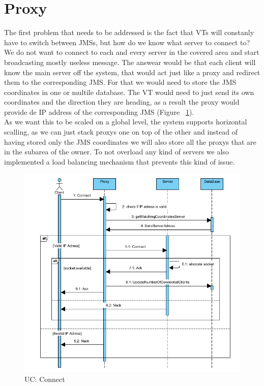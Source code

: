 \documentclass[17pt]{report}
\begin{document}
\section{Proxy}
\indent \indent
The first problem that needs to be addressed is the fact that VTs will 
constanly have to switch between JMSs, but how do we know what server to 
connect to? We do not want to connect to each and every server in the 
covered area and start broadcasting mostly useless message. The answear
would be that each client will know the main server off the system, that
would act just like a proxy and redirect them to the corresponding JMS.
For that we would need to store the JMS coordinates in one or multile
database. The VT would need to just send its own coordinates and the
direction they are heading, as a result the proxy would provide de IP
address of the corresponding JMS (Figure ~\ref{fig:UC_Connect}).\\
\indent \indent
As we want this to be scaled on a global level, the system supports
horizontal scalling, as we can just stack proxys one on top of the 
other and instead of having stored only the JMS coordinates we 
will also store all the proxys that are in the subarea of the owner. To 
not overload any kind of servers we also implemented a load balancing
mechanism that prevents this kind of issue.
\begin{figure}[h!]
    \includegraphics[width=\textwidth]{UC/Connect.png}
    \caption{UC: Connect}
    \label{fig:UC_Connect}
\end{figure}
\end{document}
